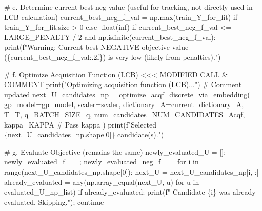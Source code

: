 \documentclass[
  letterpaper,
  DIV=11,
  numbers=noendperiod]{scrartcl}
\newenvironment{Shaded}{\begin{snugshade}}{\end{snugshade}}
\newcommand{\BuiltInTok}[1]{\textcolor[rgb]{0.00,0.23,0.31}{#1}}
\newcommand{\CommentTok}[1]{\textcolor[rgb]{0.37,0.37,0.37}{#1}}
\newcommand{\ControlFlowTok}[1]{\textcolor[rgb]{0.00,0.23,0.31}{#1}}
\newcommand{\DecValTok}[1]{\textcolor[rgb]{0.68,0.00,0.00}{#1}}
\newcommand{\KeywordTok}[1]{\textcolor[rgb]{0.00,0.23,0.31}{#1}}
\newcommand{\NormalTok}[1]{\textcolor[rgb]{0.00,0.23,0.31}{#1}}
\newcommand{\OperatorTok}[1]{\textcolor[rgb]{0.37,0.37,0.37}{#1}}
\newcommand{\SpecialCharTok}[1]{\textcolor[rgb]{0.37,0.37,0.37}{#1}}
\newcommand{\SpecialStringTok}[1]{\textcolor[rgb]{0.13,0.47,0.30}{#1}}
\newcommand{\StringTok}[1]{\textcolor[rgb]{0.13,0.47,0.30}{#1}}
\begin{document}
\begin{Shaded}
\begin{Highlighting}[]
    \CommentTok{\# e. Determine current best neg value (useful for tracking, not directly used in LCB calculation)}
\NormalTok{    current\_best\_neg\_f\_val }\OperatorTok{=}\NormalTok{ np.}\BuiltInTok{max}\NormalTok{(train\_Y\_for\_fit) }\ControlFlowTok{if}\NormalTok{ train\_Y\_for\_fit.size }\OperatorTok{\textgreater{}} \DecValTok{0} \ControlFlowTok{else} \OperatorTok{{-}}\BuiltInTok{float}\NormalTok{(}\StringTok{\textquotesingle{}inf\textquotesingle{}}\NormalTok{)}
    \ControlFlowTok{if}\NormalTok{ current\_best\_neg\_f\_val }\OperatorTok{\textless{}=} \OperatorTok{{-}}\NormalTok{LARGE\_PENALTY }\OperatorTok{/} \DecValTok{2} \KeywordTok{and}\NormalTok{ np.isfinite(current\_best\_neg\_f\_val):}
        \BuiltInTok{print}\NormalTok{(}\SpecialStringTok{f"Warning: Current best NEGATIVE objective value (}\SpecialCharTok{\{}\NormalTok{current\_best\_neg\_f\_val}\SpecialCharTok{:.2f\}}\SpecialStringTok{) is very low (likely from penalties)."}\NormalTok{)}

    \CommentTok{\# f. Optimize Acquisition Function (LCB) \textless{}\textless{}\textless{} MODIFIED CALL \& COMMENT}
    \BuiltInTok{print}\NormalTok{(}\StringTok{"Optimizing acquisition function (LCB)..."}\NormalTok{) }\CommentTok{\# Comment updated}
\NormalTok{    next\_U\_candidates\_np }\OperatorTok{=}\NormalTok{ optimize\_acqf\_discrete\_via\_embedding(}
\NormalTok{        gp\_model}\OperatorTok{=}\NormalTok{gp\_model,}
\NormalTok{        scaler}\OperatorTok{=}\NormalTok{scaler,}
\NormalTok{        dictionary\_A}\OperatorTok{=}\NormalTok{current\_dictionary\_A,}
\NormalTok{        T}\OperatorTok{=}\NormalTok{T,}
\NormalTok{        q}\OperatorTok{=}\NormalTok{BATCH\_SIZE\_q,}
\NormalTok{        num\_candidates}\OperatorTok{=}\NormalTok{NUM\_CANDIDATES\_Acqf,}
\NormalTok{        kappa}\OperatorTok{=}\NormalTok{KAPPA }\CommentTok{\# Pass kappa}
\NormalTok{    )}
    \BuiltInTok{print}\NormalTok{(}\SpecialStringTok{f"Selected }\SpecialCharTok{\{}\NormalTok{next\_U\_candidates\_np}\SpecialCharTok{.}\NormalTok{shape[}\DecValTok{0}\NormalTok{]}\SpecialCharTok{\}}\SpecialStringTok{ candidate(s)."}\NormalTok{)}

    \CommentTok{\# g. Evaluate Objective (remains the same)}
\NormalTok{    newly\_evaluated\_U }\OperatorTok{=}\NormalTok{ []}\OperatorTok{;}\NormalTok{ newly\_evaluated\_f }\OperatorTok{=}\NormalTok{ []}\OperatorTok{;}\NormalTok{ newly\_evaluated\_neg\_f }\OperatorTok{=}\NormalTok{ []}
    \ControlFlowTok{for}\NormalTok{ i }\KeywordTok{in} \BuiltInTok{range}\NormalTok{(next\_U\_candidates\_np.shape[}\DecValTok{0}\NormalTok{]):}
\NormalTok{        next\_U }\OperatorTok{=}\NormalTok{ next\_U\_candidates\_np[i, :]}
\NormalTok{        already\_evaluated }\OperatorTok{=} \BuiltInTok{any}\NormalTok{(np.array\_equal(next\_U, u) }\ControlFlowTok{for}\NormalTok{ u }\KeywordTok{in}\NormalTok{ evaluated\_U\_np\_list)}
        \ControlFlowTok{if}\NormalTok{ already\_evaluated: }\BuiltInTok{print}\NormalTok{(}\SpecialStringTok{f"  Candidate }\SpecialCharTok{\{}\NormalTok{i}\SpecialCharTok{\}}\SpecialStringTok{ was already evaluated. Skipping."}\NormalTok{)}\OperatorTok{;} \ControlFlowTok{continue}


\end{Highlighting}
\end{Shaded}
\end{document}
